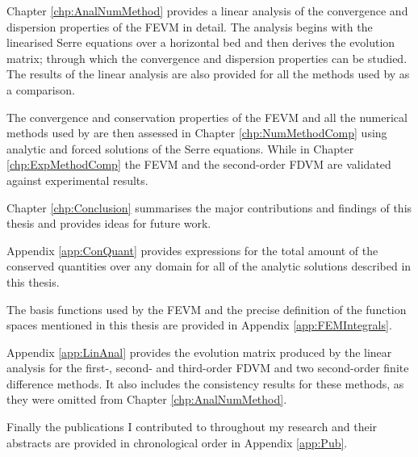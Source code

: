 Chapter \ref{chp:AnalNumMethod} provides a linear analysis of the convergence and dispersion properties of the FEVM in detail. The analysis begins with the linearised Serre equations over a horizontal bed and then derives the evolution matrix; through which the convergence and dispersion properties can be studied. The results of the linear analysis are also provided for all the methods used by \citet{Pitt-2018-61} as a comparison.

The convergence and conservation properties of the FEVM and all the numerical methods used by \citet{Pitt-2018-61} are then assessed in Chapter \ref{chp:NumMethodComp} using analytic and forced solutions of the Serre equations. While in Chapter \ref{chp:ExpMethodComp} the FEVM and the second-order FDVM are validated against experimental results.

Chapter \ref{chp:Conclusion} summarises the major contributions and findings of this thesis and provides ideas for future work.

Appendix \ref{app:ConQuant} provides expressions for the total amount of the conserved quantities over any domain for all of the analytic solutions described in this thesis. 

The basis functions used by the FEVM and the precise definition of the function spaces mentioned in this thesis are provided in Appendix \ref{app:FEMIntegrals}. 

Appendix \ref{app:LinAnal} provides the evolution matrix produced by the linear analysis for the first-, second- and third-order FDVM and two second-order finite difference methods. It also includes the consistency results for these methods, as they were omitted from Chapter \ref{chp:AnalNumMethod}.

Finally the publications I contributed to throughout my research and their abstracts are provided in chronological order in Appendix \ref{app:Pub}. 